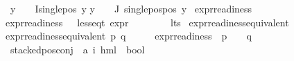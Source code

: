 \begin{isabellebody}
{\isasymor}\ {\isacharparenleft}{\kern0pt}{\isasymforall}y\ {\isasymin}\ {\isacharparenleft}{\kern0pt}{\isasymPhi}\ {\isacharbackquote}{\kern0pt}\ I{\isacharparenright}{\kern0pt}{\isachardot}{\kern0pt}single{\isacharunderscore}{\kern0pt}pos\ y{\isacharparenright}{\kern0pt}{\isachardoublequoteclose}\isanewline
{\isachardoublequoteopen}{\isacharparenleft}{\kern0pt}{\isasymforall}y\ {\isasymin}\ {\isacharparenleft}{\kern0pt}{\isasymPhi}\ {\isacharbackquote}{\kern0pt}\ J{\isacharparenright}{\kern0pt}{\isachardot}{\kern0pt}\ single{\isacharunderscore}{\kern0pt}pos{\isacharunderscore}{\kern0pt}pos\ y{\isacharparenright}{\kern0pt}{\isachardoublequoteclose}\isanewline
\isanewline
\isanewline
{}\isamarkupfalse%
\ expr{\isacharunderscore}{\kern0pt}readiness\isanewline
\ \ \isanewline
{\isachardoublequoteopen}expr{\isacharunderscore}{\kern0pt}readiness\ {\isacharequal}{\kern0pt}\ {\isacharbraceleft}{\kern0pt}{\isasymphi}{\isachardot}{\kern0pt}\ {\isacharparenleft}{\kern0pt}less{\isacharunderscore}{\kern0pt}eq{\isacharunderscore}{\kern0pt}t\ {\isacharparenleft}{\kern0pt}expr\ {\isasymphi}{\isacharparenright}{\kern0pt}\ {\isacharparenleft}{\kern0pt}{\isasyminfinity}{\isacharcomma}{\kern0pt}\ {}{\isacharcomma}{\kern0pt}\ {}{\isacharcomma}{\kern0pt}\ {}{\isacharcomma}{\kern0pt}\ {}{\isacharcomma}{\kern0pt}\ {}{\isacharparenright}{\kern0pt}{\isacharparenright}{\kern0pt}{\isacharbraceright}{\kern0pt}{\isachardoublequoteclose}\isanewline
\isanewline
{}\isamarkupfalse%
\ lts\isanewline
{}\isanewline
\isanewline
{}\isamarkupfalse%
\ expr{\isacharunderscore}{\kern0pt}readiness{\isacharunderscore}{\kern0pt}equivalent\ \isanewline
\ \ \isanewline
{\isachardoublequoteopen}expr{\isacharunderscore}{\kern0pt}readiness{\isacharunderscore}{\kern0pt}equivalent\ p\ q\ {\isasymequiv}\ {\isacharparenleft}{\kern0pt}{\isasymforall}\ {\isasymphi}{\isachardot}{\kern0pt}\ {\isasymphi}\ {\isasymin}\ expr{\isacharunderscore}{\kern0pt}readiness\ {\isasymlongrightarrow}\ {\isacharparenleft}{\kern0pt}p\ {\isasymTurnstile}\ {\isasymphi}{\isacharparenright}{\kern0pt}\ {\isasymlongleftrightarrow}\ {\isacharparenleft}{\kern0pt}q\ {\isasymTurnstile}\ {\isasymphi}{\isacharparenright}{\kern0pt}{\isacharparenright}{\kern0pt}{\isachardoublequoteclose}\isanewline
\isanewline
{}\isamarkupfalse%
\isanewline
\isanewline
{}\isamarkupfalse%
\ stacked{\isacharunderscore}{\kern0pt}pos{\isacharunderscore}{\kern0pt}conj\ {\isacharcolon}{\kern0pt}{\isacharcolon}{\kern0pt}\ {\isachardoublequoteopen}{\isacharparenleft}{\kern0pt}{\isacharprime}{\kern0pt}a{\isacharcomma}{\kern0pt}\ {\isacharprime}{\kern0pt}i{\isacharparenright}{\kern0pt}\ hml\ {\isasymRightarrow}\ bool{\isachardoublequoteclose}\isanewline

\end{isabellebody}
